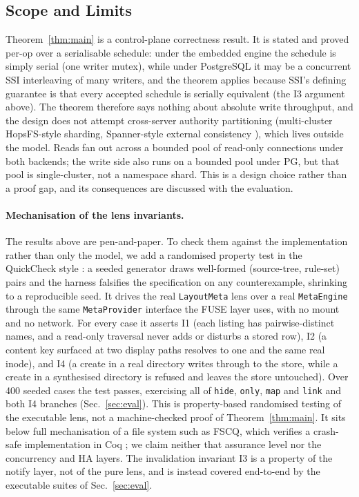 \documentclass[numberedsection,acmtos]{acmart}
\begin{document}
\subsection{Scope and Limits}\label{sec:limits}
Theorem~\ref{thm:main} is a control-plane correctness result. It is stated
and proved per-op over a serialisable schedule: under the embedded engine the
schedule is simply serial (one writer mutex), while under PostgreSQL it may be
a concurrent SSI interleaving of many writers, and the theorem applies because
SSI's defining guarantee is that every accepted schedule is serially
equivalent \citep{ports2012,hopsfs} (the I3 argument above). The theorem
therefore says nothing about absolute write throughput, and the design does
not attempt cross-server authority partitioning (multi-cluster HopsFS-style
sharding, Spanner-style external consistency \citep{spanner}), which lives
outside the model. Reads fan out across a bounded pool of read-only
connections under both backends; the write side also runs on a bounded pool
under PG, but that pool is single-cluster, not a namespace shard. This is a
design choice rather than a proof gap, and its consequences are discussed with
the evaluation.

\paragraph{Mechanisation of the lens invariants.}
The results above are pen-and-paper. To check them against the implementation
rather than only the model, we add a randomised property test in the
QuickCheck style \citep{quickcheck}: a seeded generator draws well-formed
(source-tree, rule-set) pairs and the harness falsifies the specification on
any counterexample, shrinking to a reproducible seed. It drives the real
\texttt{LayoutMeta} lens over a real \texttt{MetaEngine} through the same
\texttt{MetaProvider} interface the FUSE layer uses, with no mount and no
network. For every case it asserts I1 (each listing has pairwise-distinct names,
and a read-only traversal never adds or disturbs a stored row), I2 (a content key
surfaced at two display paths resolves to one and the same real inode), and I4
(a create in a real directory writes through to the store, while a create in a
synthesised directory is refused and leaves the store untouched). Over 400 seeded
cases the test passes, exercising all of \texttt{hide}, \texttt{only},
\texttt{map} and \texttt{link} and both I4 branches (Sec.~\ref{sec:eval}).
This is property-based randomised testing of the executable lens, not a
machine-checked proof of Theorem~\ref{thm:main}. It sits below full mechanisation of a file system such
as FSCQ, which verifies a crash-safe implementation in Coq \citep{fscq}; we
claim neither that assurance level nor the concurrency and HA layers. The
invalidation invariant I3 is a property of the notify layer, not of the pure
lens, and is instead covered end-to-end by the executable suites of
Sec.~\ref{sec:eval}.
\end{document}
